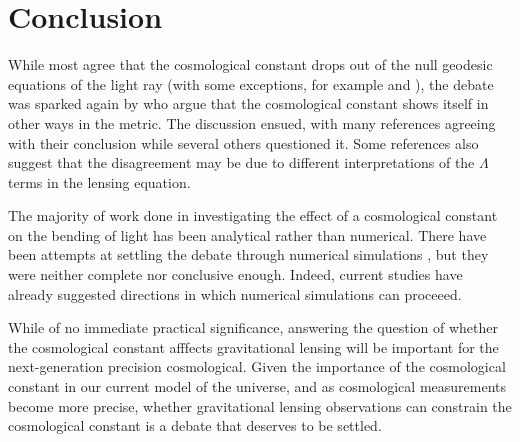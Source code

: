 \section{Conclusion}\label{section:conclusion}

While most agree that the cosmological constant drops out of the null geodesic equations of the light ray (with some exceptions, for example \citet{Bhadra2010} and \citet{HAMMAD2013}), the debate was sparked again by \citet{Rindler2007} who argue that the cosmological constant shows itself in other ways in the metric. The discussion ensued, with many references agreeing with their conclusion while several others questioned it. Some references also suggest that the disagreement may be due to different interpretations of the $\Lambda$ terms in the lensing equation. 

The majority of work done in investigating the effect of a cosmological constant on the bending of light has been analytical rather than numerical. There have been attempts at settling the debate through numerical simulations \citep{beyon2012}, but they were neither complete nor conclusive enough. Indeed, current studies have already suggested directions in which numerical simulations can proceeed. 

While of no immediate practical significance, answering the question of whether the cosmological constant afffects gravitational lensing will be important for the next-generation precision cosmological. Given the importance of the cosmological constant in our current model of the universe, and as cosmological measurements become more precise, whether gravitational lensing observations can constrain the cosmological constant is a debate that deserves to be settled. 
